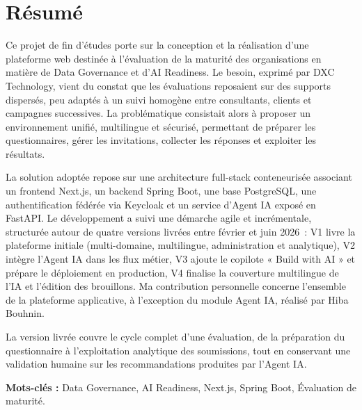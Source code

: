\documentclass[12pt,a4paper]{report}
\begin{document}
\chapter*{Résumé}
Ce projet de fin d'études porte sur la conception et la réalisation d'une plateforme web destinée à l'évaluation de la maturité des organisations en matière de Data Governance et d'AI Readiness. Le besoin, exprimé par DXC Technology, vient du constat que les évaluations reposaient sur des supports dispersés, peu adaptés à un suivi homogène entre consultants, clients et campagnes successives. La problématique consistait alors à proposer un environnement unifié, multilingue et sécurisé, permettant de préparer les questionnaires, gérer les invitations, collecter les réponses et exploiter les résultats.

La solution adoptée repose sur une architecture full-stack conteneurisée associant un frontend Next.js, un backend Spring Boot, une base PostgreSQL, une authentification fédérée via Keycloak et un service d'Agent IA exposé en FastAPI. Le développement a suivi une démarche agile et incrémentale, structurée autour de quatre versions livrées entre février et juin 2026~: V1 livre la plateforme initiale (multi-domaine, multilingue, administration et analytique), V2 intègre l'Agent IA dans les flux métier, V3 ajoute le copilote « Build with AI » et prépare le déploiement en production, V4 finalise la couverture multilingue de l'IA et l'édition des brouillons. Ma contribution personnelle concerne l'ensemble de la plateforme applicative, à l'exception du module Agent IA, réalisé par Hiba Bouhnin.

La version livrée couvre le cycle complet d'une évaluation, de la préparation du questionnaire à l'exploitation analytique des soumissions, tout en conservant une validation humaine sur les recommandations produites par l'Agent IA.

\textbf{Mots-clés :} Data Governance, AI Readiness, Next.js, Spring Boot, Évaluation de maturité.
\end{document}
